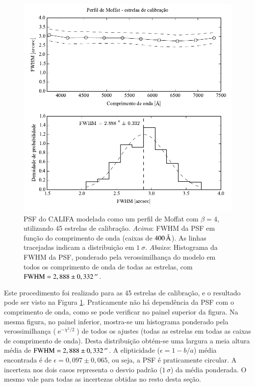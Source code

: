 
\begin{figure}
	\includegraphics{figuras/PSFMoffatBeta4_calib}
	\caption[PSF do CALIFA -- estrelas de calibração.]
	{PSF do CALIFA modelada como um perfil de Moffat com $\beta=4$, utilizando 45
	estrelas de calibração. {\em Acima}: FWHM da PSF em função do comprimento de
	onda (caixas de $400\,\text{\normalfont\AA}$). As linhas tracejadas indicam a distribuição
	em $1\ \sigma$. {\em Abaixo}: Histograma da FWHM da PSF, ponderado pela
	verossimilhança do modelo em todos os comprimento de onda de todas as estrelas,
	com $\mathrm{FWHM}=2,888 \pm 0,332\,^{\prime\prime}$.}
	\label{fig:PSFCalib}
\end{figure}

Este procedimento foi realizado para as 45 estrelas de calibração, e o resultado
pode ser visto na Figura \ref{fig:PSFCalib}. Praticamente não há dependência da
PSF com o comprimento de onda, como se pode verificar no painel superior da
figura. Na mesma figura, no painel inferior, mostra-se um histograma ponderado
pela verossimilhança ($\operatorname{e}^{-\chi^2/2}$) de todos os ajustes (todas
as estrelas em todas as caixas de comprimento de onda). Desta distribuição
obtém-se uma largura a meia altura média de $\mathrm{FWHM} = 2,888 \pm
0,332\,^{\prime\prime}$. A elipticidade ($\epsilon = 1 - b/a$) média encontrada é de
$\epsilon = 0,097 \pm 0,065$, ou seja, a PSF é praticamente circular. A
incerteza nos dois casos representa o desvio padrão ($1\,\sigma$) da média
ponderada. O mesmo vale para todas as incertezas obtidas no resto desta seção.

